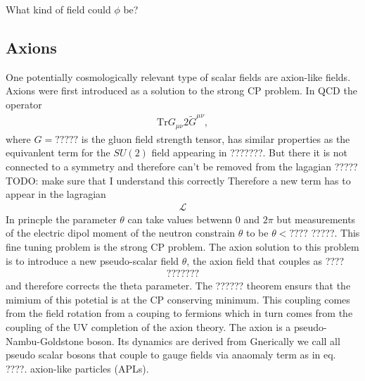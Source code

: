 \documentclass[13pt,a4paper,twoside,titlepage]{article}
\begin{document}
\noindent
What kind of field could $\phi$ be?













\subsection{Axions}
\label{sec:axions}

One potentially cosmologically relevant type of scalar fields are axion-like fields.
Axions were first introduced as a solution to the strong CP problem.
In QCD the operator
\begin{align}
    \mathrm{Tr} G_{\mu \nu} 2\tilde{G}^{\mu \nu},
\end{align}
where $G = ?????$ is the gluon field strength tensor,
has similar properties as the equivanlent term for the $SU(2)$ field appearing
in ???????. But there it is not connected to a symmetry and therefore can't
be removed from the lagagian ????? TODO: make sure that I understand this correctly
Therefore a new term has to appear in the lagragian
\begin{align}
    \mathcal{L}
\end{align}
In princple the parameter $\theta$ can take values betwenn 0 and $2\pi$ but measurements of the electric dipol moment of the neutron constrain $\theta$ to
be $\theta < ????$ ?????.
This fine tuning problem is the strong CP problem.
The axion solution to this problem is to introduce a new pseudo-scalar field
$\theta$, the axion field that couples as ????
\begin{align}
    ???????
\end{align}
and therefore corrects the theta parameter. The ?????? theorem ensurs that
the mimium of this potetial is at the CP conserving minimum.
This coupling comes from the field rotation from a couping to fermions which in turn comes from
the coupling of the UV completion of the axion theory.
The axion is a pseudo-Nambu-Goldstone boson. Its dynamics are derived from
Gnerically we call all pseudo scalar bosons that couple to gauge fields via anaomaly term as in eq. ????.
axion-like particles (APLs).
\end{document}
